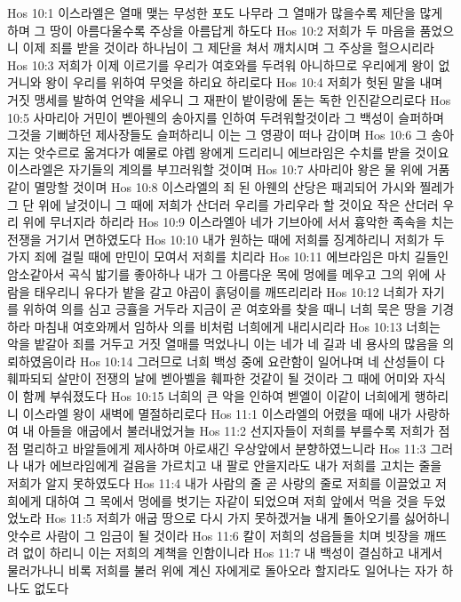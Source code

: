 Hos 10:1  이스라엘은 열매 맺는 무성한 포도 나무라 그 열매가 많을수록 제단을 많게 하며 그 땅이 아름다울수록 주상을 아름답게 하도다
Hos 10:2  저희가 두 마음을 품었으니 이제 죄를 받을 것이라 하나님이 그 제단을 쳐서 깨치시며 그 주상을 헐으시리라
Hos 10:3  저희가 이제 이르기를 우리가 여호와를 두려워 아니하므로 우리에게 왕이 없거니와 왕이 우리를 위하여 무엇을 하리요 하리로다
Hos 10:4  저희가 헛된 말을 내며 거짓 맹세를 발하여 언약을 세우니 그 재판이 밭이랑에 돋는 독한 인진같으리로다
Hos 10:5  사마리아 거민이 벧아웬의 송아지를 인하여 두려워할것이라 그 백성이 슬퍼하며 그것을 기뻐하던 제사장들도 슬퍼하리니 이는 그 영광이 떠나 감이며
Hos 10:6  그 송아지는 앗수르로 옮겨다가 예물로 야렙 왕에게 드리리니 에브라임은 수치를 받을 것이요 이스라엘은 자기들의 계의를 부끄러워할 것이며
Hos 10:7  사마리아 왕은 물 위에 거품 같이 멸망할 것이며
Hos 10:8  이스라엘의 죄 된 아웬의 산당은 패괴되어 가시와 찔레가 그 단 위에 날것이니 그 때에 저희가 산더러 우리를 가리우라 할 것이요 작은 산더러 우리 위에 무너지라 하리라
Hos 10:9  이스라엘아 네가 기브아에 서서 흉악한 족속을 치는 전쟁을 거기서 면하였도다
Hos 10:10  내가 원하는 때에 저희를 징계하리니 저희가 두 가지 죄에 걸릴 때에 만민이 모여서 저희를 치리라
Hos 10:11  에브라임은 마치 길들인 암소같아서 곡식 밟기를 좋아하나 내가 그 아름다운 목에 멍에를 메우고 그의 위에 사람을 태우리니 유다가 밭을 갈고 야곱이 흙덩이를 깨뜨리리라
Hos 10:12  너희가 자기를 위하여 의를 심고 긍휼을 거두라 지금이 곧 여호와를 찾을 때니 너희 묵은 땅을 기경하라 마침내 여호와께서 임하사 의를 비처럼 너희에게 내리시리라
Hos 10:13  너희는 악을 밭갈아 죄를 거두고 거짓 열매를 먹었나니 이는 네가 네 길과 네 용사의 많음을 의뢰하였음이라
Hos 10:14  그러므로 너희 백성 중에 요란함이 일어나며 네 산성들이 다 훼파되되 살만이 전쟁의 날에 벧아벨을 훼파한 것같이 될 것이라 그 때에 어미와 자식이 함께 부숴졌도다
Hos 10:15  너희의 큰 악을 인하여 벧엘이 이같이 너희에게 행하리니 이스라엘 왕이 새벽에 멸절하리로다
Hos 11:1  이스라엘의 어렸을 때에 내가 사랑하여 내 아들을 애굽에서 불러내었거늘
Hos 11:2  선지자들이 저희를 부를수록 저희가 점점 멀리하고 바알들에게 제사하며 아로새긴 우상앞에서 분향하였느니라
Hos 11:3  그러나 내가 에브라임에게 걸음을 가르치고 내 팔로 안을지라도 내가 저희를 고치는 줄을 저희가 알지 못하였도다
Hos 11:4  내가 사람의 줄 곧 사랑의 줄로 저희를 이끌었고 저희에게 대하여 그 목에서 멍에를 벗기는 자같이 되었으며 저희 앞에서 먹을 것을 두었었노라
Hos 11:5  저희가 애굽 땅으로 다시 가지 못하겠거늘 내게 돌아오기를 싫어하니 앗수르 사람이 그 임금이 될 것이라
Hos 11:6  칼이 저희의 성읍들을 치며 빗장을 깨뜨려 없이 하리니 이는 저희의 계책을 인함이니라
Hos 11:7  내 백성이 결심하고 내게서 물러가나니 비록 저희를 불러 위에 계신 자에게로 돌아오라 할지라도 일어나는 자가 하나도 없도다
